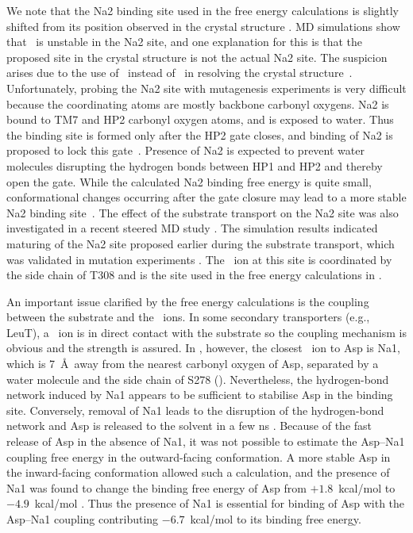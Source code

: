 We note that the Na2 binding site used in the free energy calculations is 
slightly shifted from its position observed in the crystal structure 
\cite{Boudker2007}. MD simulations show that \Na\ is unstable in the Na2 site, 
and one explanation for this is that the proposed site in the crystal structure is 
not the actual Na2 site. The suspicion arises due to the use of \Tl\ instead of \Na\ 
in resolving the crystal structure~\cite{Boudker2007}. Unfortunately, probing the 
Na2 site with mutagenesis experiments is very difficult because the coordinating atoms 
are mostly backbone carbonyl oxygens. Na2 is bound to TM7 and HP2 carbonyl oxygen atoms, 
and is exposed to water. Thus the binding site is formed only after the HP2 gate closes, 
and binding of Na2 is proposed to lock this gate~\cite{Boudker2007}. Presence of Na2 
is expected to prevent water molecules disrupting the hydrogen bonds between HP1 
and HP2 and thereby open the gate. While the calculated Na2 binding free energy 
is quite small, conformational changes occurring after the gate closure may 
lead to a more stable Na2 binding site~\cite{Lev2013}. The effect of the substrate 
transport on the Na2 site was also investigated in a recent steered MD study 
\cite{Venkatesan2015}. The simulation results indicated maturing of the Na2 site 
proposed earlier \cite{Heinzelmann2011} during the substrate transport, which was 
validated in mutation experiments \cite{Venkatesan2015}. The \Na\ ion at this site 
is coordinated by the side chain of T308 and is the site used in the free energy 
calculations in \tabref{review:tab1}.

An important issue clarified by the free energy calculations is the coupling 
between the substrate and the \Na\ ions. In some secondary transporters (e.g., 
LeuT), a \Na\ ion is in direct contact with the substrate so the coupling 
mechanism is obvious and the strength is assured. In \GltPh, however, the 
closest \Na\ ion to Asp is Na1, which is 7~\AA\ away from the nearest carbonyl 
oxygen of Asp, separated by a water molecule and the side chain of S278 
(\figref{review:fig3}). Nevertheless, the hydrogen-bond network induced by 
Na1 appears to be sufficient to stabilise Asp in the binding site. Conversely, 
removal of Na1 leads to the disruption of the hydrogen-bond network and Asp is 
released to the solvent in a few ns \cite{Heinzelmann2011}. Because of the fast 
release of Asp in the absence of Na1, it was not possible to estimate the 
Asp--Na1 coupling free energy in the outward-facing conformation. A more stable 
Asp in the inward-facing conformation allowed such a calculation, and the 
presence of Na1 was found to change the binding free energy of Asp from 
$+1.8$~kcal/mol to $-4.9$~kcal/mol \cite{Heinzelmann2013}. Thus the presence of 
Na1 is essential for binding of Asp with the Asp--Na1 coupling contributing 
$-6.7$~kcal/mol to its binding free energy.

